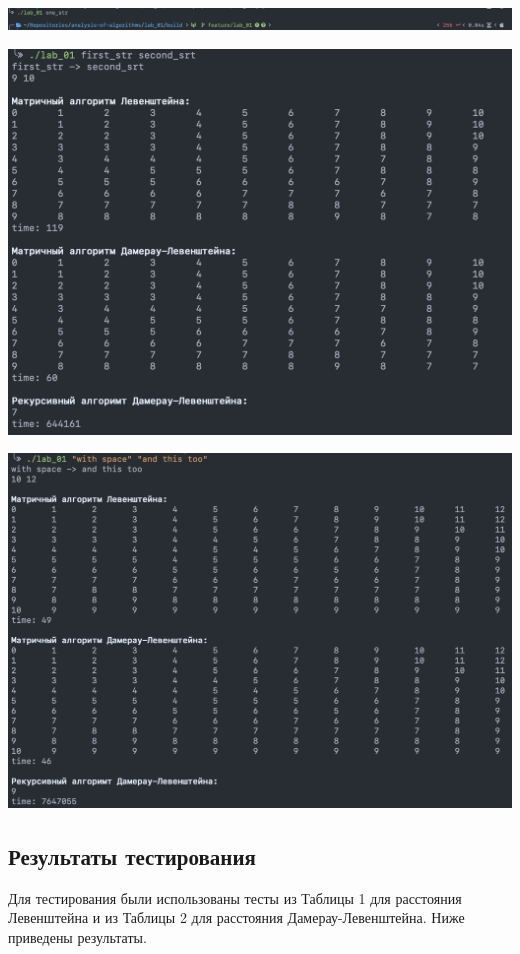 \documentclass[a4paper,12pt]{article}
\begin{document}
\includegraphics[scale=0.35]{one_arg}

\includegraphics[scale=0.5]{good_work}

\includegraphics[scale=0.5]{good_space}

\subsection{Результаты тестирования}

Для тестирования были использованы тесты из Таблицы 1 для расстояния
Левенштейна и из Таблицы 2 для расстояния Дамерау-Левенштейна. Ниже
приведены результаты.
\end{document}
